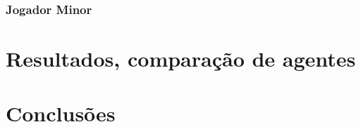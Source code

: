 \documentclass[12pt]{article}
\begin{document}
	
	\subsubsection*{Jogador Minor}
	
	
	\newpage
	\section*{Resultados, comparação de agentes}
	
	
	\newpage
	\section*{Conclusões}
	
	
\end{document}
